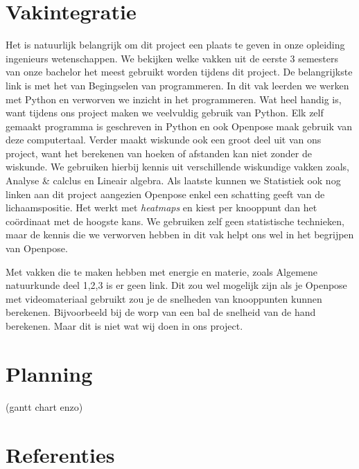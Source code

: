 \documentclass{article}
\begin{document}
\section{Vakintegratie}
Het is natuurlijk belangrijk om dit project een plaats te geven in onze opleiding ingenieurs wetenschappen. We bekijken welke vakken uit de eerste 3 semesters van onze bachelor het meest gebruikt worden tijdens dit project. De belangrijkste link is met het van Begingselen van programmeren. In dit vak leerden we werken met Python en verworven we inzicht in het programmeren. Wat heel handig is, want tijdens ons project maken we veelvuldig gebruik van Python. Elk zelf gemaakt programma is geschreven in Python en ook Openpose maak gebruik van deze computertaal. Verder maakt wiskunde ook een groot deel uit van ons project, want het berekenen van hoeken of afstanden kan niet zonder de wiskunde. We gebruiken hierbij kennis uit verschillende wiskundige vakken zoals, Analyse \& calclus en Lineair algebra. Als laatste kunnen we Statistiek ook nog linken aan dit project aangezien Openpose enkel een schatting geeft van de lichaamspositie. Het werkt met \textit{heatmaps} en kiest per knooppunt dan het coördinaat met de hoogste kans. We gebruiken zelf geen statistische technieken, maar de kennis die we verworven hebben in dit vak helpt ons wel in het begrijpen van Openpose. 

Met vakken die te maken hebben met energie en materie, zoals Algemene natuurkunde deel 1,2,3 is er geen link. Dit zou wel mogelijk zijn als je Openpose met videomateriaal gebruikt zou je de snelheden van knooppunten kunnen berekenen. Bijvoorbeeld bij de worp van een bal de snelheid van de hand berekenen. Maar dit is niet wat wij doen in ons project.
\section{Planning}
(gantt chart enzo\texttt{})

\section{Referenties}
\end{document}
